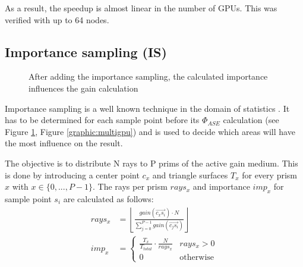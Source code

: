 As a result, the speedup is almost linear in the number of GPUs. This was
verified with up to 64 nodes.
    

\subsection{Importance sampling (IS)}
\label{subsec:importance_sampling}
\begin{figure}[H]
  \centerline
  {}
  \caption{After adding the importance sampling, the calculated importance 
  influences the gain calculation}
  \label{graphic:pap2}
\end{figure}
Importance sampling is a well known technique in the domain
of statistics \cite{importanceSamplingSource}. It has to be determined for each
sample point before its $\Phi_{ASE}$ calculation (see Figure \ref{graphic:pap2},
Figure \ref{graphic:multigpu}) and is used 
to decide which areas will have the most influence on the result.

The objective is to distribute N rays to P prims of the active gain medium.
This is done by introducing a center point $c_x$ and triangle surfaces $T_x$ for every prism $x$ with $x \in \{0,...,P-1\}$.
 The rays per prism $rays_x$ and importance $imp_x$ for sample point $s_i$ are calculated as follows:
\begin{align}
  rays_x       &= \left\lfloor\frac{gain(\overrightarrow{c_xs_i}) \cdot N}{\sum^{P-1}_{j=0} gain(\overrightarrow{c_js_i})}\right\rfloor\\
imp_x &= 
\begin{cases}
\frac{T_x}{T_{total}} \cdot \frac{N}{rays_x} &rays_x > 0\\
0 &\text{otherwise}
\end{cases}
\end{align}

